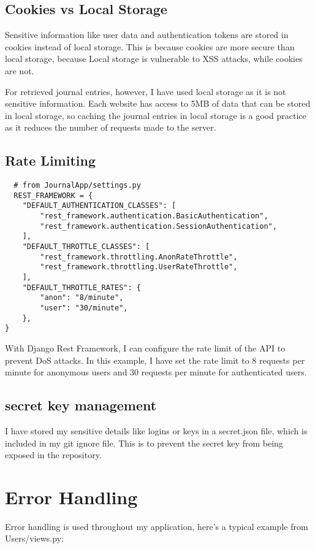 \subsection{Cookies vs Local Storage}
Sensitive information like user data and authentication tokens are stored in cookies instead of local storage. This is because cookies are more secure than local storage, because Local storage is vulnerable to XSS attacks, while cookies are not. 

For retrieved journal entries, however, I have used local storage as it is not sensitive information. Each website has access to 5MB of data that can be stored in local storage, so caching the journal entries in local storage is a good practice as it reduces the number of requests made to the server.

\subsection{Rate Limiting}
\begin{verbatim}
  # from JournalApp/settings.py
  REST_FRAMEWORK = {
    "DEFAULT_AUTHENTICATION_CLASSES": [
        "rest_framework.authentication.BasicAuthentication",
        "rest_framework.authentication.SessionAuthentication",
    ],
    "DEFAULT_THROTTLE_CLASSES": [
        "rest_framework.throttling.AnonRateThrottle",
        "rest_framework.throttling.UserRateThrottle",
    ],
    "DEFAULT_THROTTLE_RATES": {
        "anon": "8/minute",
        "user": "30/minute",
    },
}
\end{verbatim}
With Django Rest Framework, I can configure the rate limit of the API to prevent DoS attacks. In this example, I have set the rate limit to 8 requests per minute for anonymous users and 30 requests per minute for authenticated users. 

\subsection{secret key management}
I have stored my sensitive details like logins or keys in a secret.json file, which is included in my git ignore file. This is to prevent the secret key from being exposed in the repository. 

\section{Error Handling}
Error handling is used throughout my application, here's a typical example from Users/views.py:

